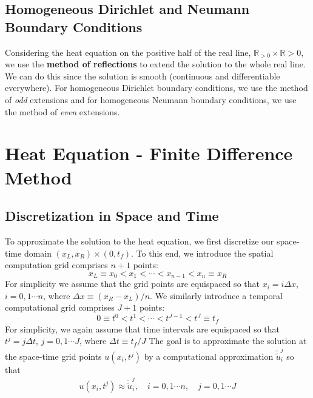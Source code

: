 \documentclass[11pt]{article}
\newcommand{\R}{\mathbb{R}}
\begin{document}
\subsection{Homogeneous Dirichlet and Neumann  Boundary Conditions}
Considering the heat equation on the positive half of the real line, $\R_{>0} \times \R{>0}$, we use the \textbf{method of reflections} to extend the solution to the whole real line. We can do this since the solution is smooth (continuous and differentiable everywhere). For homogeneous Dirichlet boundary conditions, we use the method of \textit{odd} extensions and for homogeneous Neumann boundary conditions, we use the method of \textit{even} extensions. 


\pagebreak

\section{Heat Equation - Finite Difference Method}

\subsection{Discretization in Space and Time}
To approximate the solution to the heat equation, we first discretize our space-time domain $(x_L, x_R) \times (0, t_f )$. To this end, we introduce the spatial computation grid comprises $n + 1$ points:
$$x_L \equiv x_0 <x_1 < \cdots < x_{n-1} <x_n \equiv x_R$$
 For simplicity we assume that the grid points are equispaced so that $x_i = i \Delta x$, $i = 0,1\cdots n$, where $\Delta x \equiv (x_R - x_L)/n$. We similarly introduce a temporal computational grid comprises $J + 1$ points:
$$0 \equiv t^0 <t^1 < \cdots < t^{J-1} <t^J \equiv t_f$$
For simplicity, we again assume that time intervals are equispaced so that $t^j = j \Delta t$, $j = 0,1\cdots J$, where $\Delta t \equiv t_f/J$
The goal is to approximate the solution at the space-time grid points $u(x_i,t^j)$
by a computational approximation $\tilde{\tilde{u}}_i^j$ so that
$$u(x_i,t^j) \approx \tilde{\tilde{u}}_i^j, \quad i = 0,1\cdots n, \quad  j= 0,1 \cdots J$$
\end{document}
